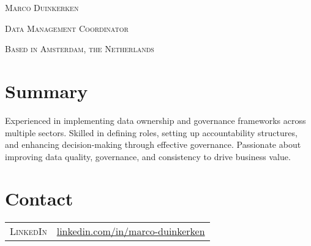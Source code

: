 \documentclass[a4paper,10pt]{article}
\begin{document}
\par{
  
    \Huge \textsc{Marco Duinkerken}\par
    \large \textsc{Data Management Coordinator}\par
    \small \textsc{{Based in Amsterdam, the Netherlands}}\par  
  \par
}
\section*{Summary}
Experienced in implementing data ownership and governance frameworks across multiple sectors. Skilled in defining roles, setting up accountability structures, and enhancing decision-making through effective governance. Passionate about improving data quality, governance, and consistency to drive business value.

\vspace{0.5em}

\section{Contact}
\begin{tabular}{r l}
  \textsc{\faLinkedin{} LinkedIn} &  \href{https://www.linkedin.com/in/marco-duinkerken/}{linkedin.com/in/marco-duinkerken}\\
\end{tabular}
\end{document}
